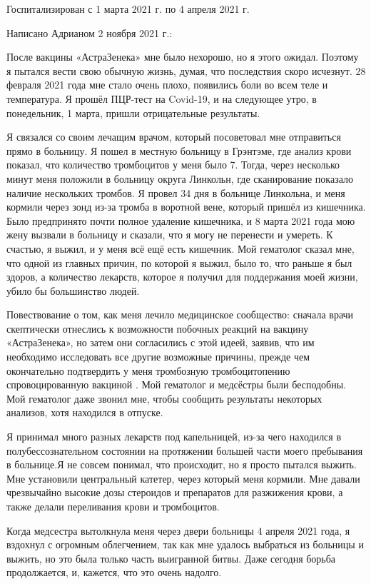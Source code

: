 Госпитализирован с 1 марта 2021 г. по 4 апреля 2021 г.

Написано Адрианом 2 ноября 2021 г.:

После вакцины «АстраЗенека» мне было нехорошо, но я этого ожидал. Поэтому я
пытался вести свою обычную жизнь, думая, что последствия скоро исчезнут. 28
февраля 2021 года мне стало очень плохо, появились боли во всем теле и
температура. Я прошёл ПЦР-тест на Covid-19, и на следующее утро, в понедельник,
1 марта, пришли отрицательные результаты.

Я связался со своим лечащим врачом, который посоветовал мне отправиться прямо в
больницу. Я пошел в местную больницу в Грэнтэме, где анализ крови показал, что
количество тромбоцитов у меня было 7. Тогда, через несколько минут меня положили
в больницу округа Линкольн, где сканирование показало наличие нескольких
тромбов. Я провел 34 дня в больнице Линкольна, и меня кормили через зонд из-за
тромба в воротной вене, который пришёл из кишечника. Было предпринято почти
полное удаление кишечника, и 8 марта 2021 года мою жену вызвали в больницу и
сказали, что я могу не перенести и умереть. К счастью, я выжил, и у меня всё ещё
есть кишечник. Мой гематолог сказал мне, что одной из главных причин, по которой
я выжил, было то, что раньше я был здоров, а количество лекарств, которое я
получил для поддержания моей жизни, убило бы большинство людей.

Повествование о том, как меня лечило медицинское сообщество: сначала врачи
скептически отнеслись к возможности побочных реакций на вакцину «АстраЗенека»,
но затем они согласились с этой идеей, заявив, что им необходимо исследовать все
другие возможные причины, прежде чем окончательно подтвердить у меня тромбозную
тромбоцитопению спровоцированную вакциной . Мой гематолог и медсёстры были
бесподобны. Мой гематолог даже звонил мне, чтобы сообщить результаты некоторых
анализов, хотя находился в отпуске.

Я принимал много разных лекарств под капельницей, из-за чего находился в
полубессознательном состоянии на протяжении большей части моего пребывания в
больнице.Я не совсем понимал, что происходит, но я просто пытался выжить. Мне
установили центральный катетер, через который меня кормили. Мне давали
чрезвычайно высокие дозы стероидов и препаратов для разжижения крови, а также
делали переливания крови и тромбоцитов.

Когда медсестра вытолкнула меня через двери больницы 4 апреля 2021 года, я
вздохнул с огромным облегчением, так как мне удалось выбраться из больницы и
выжить, но это была только часть выигранной битвы. Даже сегодня борьба
продолжается, и, кажется, что это очень надолго.

